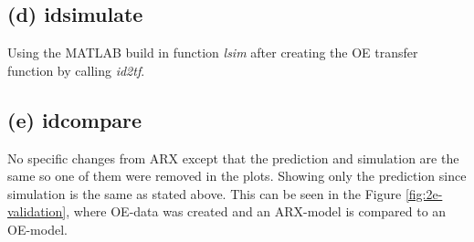 \documentclass[]{article}
\begin{document}
\subsection{(d) idsimulate}
Using the MATLAB build in function \emph{lsim} after creating the OE transfer function by calling \emph{id2tf}.

\subsection{(e) idcompare}
No specific changes from ARX except that the prediction and simulation are the same so one of them were removed in the plots.
Showing only the prediction since simulation is the same as stated above. This can be seen in the Figure \ref{fig:2e-validation}, where OE-data was created and an ARX-model is compared to an OE-model.
\end{document}
